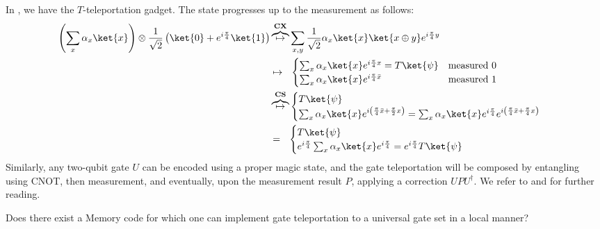 In , we have the $T$-teleportation gadget. The state progresses up to the measurement as follows:
\begin{equation*}
    \begin{split}
        \left(\sum_{x}\alpha_{x}\ket{x}\right)\otimes\frac{1}{\sqrt{2}} \left(  \ket{0} + e^{i\frac{\pi}{4}}\ket{1}\right) & \overbrace{  \mapsto }^{ \textbf{CX} } \sum_{x,y}\frac{1}{\sqrt{2}}\alpha_{x}\ket{x}\ket{x\oplus y}e^{i\frac{\pi}{4} y} \\ 
        & \mapsto \ \ \begin{cases}
         \sum_{x}\alpha_x\ket{x}e^{i\frac{\pi}{4}x} = T\ket{\psi}   & \text{measured } 0 \\
           \sum_{x}\alpha_x\ket{x}e^{i\frac{\pi}{4}\bar{x}} & \text{measured } 1
        \end{cases} \\ 
        & \overbrace{  \mapsto }^{ \textbf{CS} } \begin{cases}
          T\ket{\psi}    \\
           \sum_{x}\alpha_x\ket{x}e^{i\left( \frac{\pi}{4}\bar{x} + \frac{\pi}{2}x \right)} =  \sum_{x}\alpha_x\ket{x}e^{i\frac{\pi}{4}}e^{i\left( \frac{\pi}{4}\bar{x} + \frac{\pi}{4}x \right)}
        \end{cases} \\ 
        & = \ \ \begin{cases}
          T\ket{\psi}    \\
           e^{i\frac{\pi}{4} } \sum_{x}\alpha_x\ket{x}e^{i\frac{\pi}{4}} = e^{i\frac{\pi}{4} } T\ket{\psi}
        \end{cases} 
    \end{split}
\end{equation*}
Similarly, any two-qubit gate $U$ can be encoded using a proper magic state, and the gate teleportation will be composed by entangling using CNOT, then measurement, and eventually, upon the measurement result $P$, applying a correction $UPU^{\dagger}$. We refer to \cite{gottesman2014faulttolerant} and \cite{grospellier:tel-03364419} for further reading. 


\begin{oproblem}
Does there exist a Memory code for which one can implement gate teleportation to a universal gate set in a local manner?
\end{oproblem}


